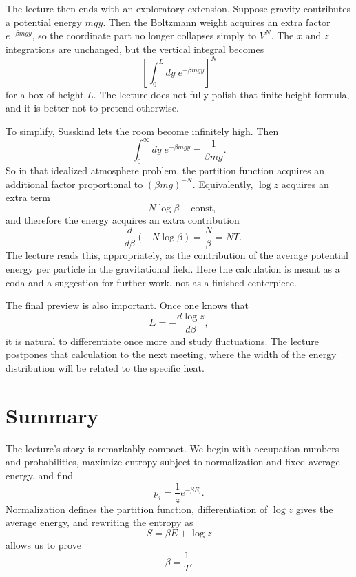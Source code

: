 The lecture then ends with an exploratory extension. Suppose gravity contributes a potential energy \(mgy\). Then the Boltzmann weight acquires an extra factor \(e^{-\beta mgy}\), so the coordinate part no longer collapses simply to \(V^N\). The \(x\) and \(z\) integrations are unchanged, but the vertical integral becomes
\begin{equation}
\left[\int_0^{L}dy\;e^{-\beta mgy}\right]^N
\end{equation}
for a box of height \(L\). The lecture does not fully polish that finite-height formula, and it is better not to pretend otherwise.

To simplify, Susskind lets the room become infinitely high. Then
\begin{equation}
\int_0^\infty dy\;e^{-\beta mgy}=\frac{1}{\beta m g}.
\end{equation}
So in that idealized atmosphere problem, the partition function acquires an additional factor proportional to \((\beta m g)^{-N}\). Equivalently, \(\log z\) acquires an extra term
\begin{equation}
-N\log\beta + \mathrm{const},
\end{equation}
and therefore the energy acquires an extra contribution
\begin{equation}
-\frac{d}{d\beta}\left(-N\log\beta\right)=\frac{N}{\beta}=NT.
\end{equation}
The lecture reads this, appropriately, as the contribution of the average potential energy per particle in the gravitational field. Here the calculation is meant as a coda and a suggestion for further work, not as a finished centerpiece.

The final preview is also important. Once one knows that
\begin{equation}
E=-\frac{d\log z}{d\beta},
\end{equation}
it is natural to differentiate once more and study fluctuations. The lecture postpones that calculation to the next meeting, where the width of the energy distribution will be related to the specific heat.

\section{Summary}

The lecture's story is remarkably compact. We begin with occupation numbers and probabilities, maximize entropy subject to normalization and fixed average energy, and find
\begin{equation}
p_i=\frac{1}{z}e^{-\beta E_i}.
\end{equation}
Normalization defines the partition function, differentiation of \(\log z\) gives the average energy, and rewriting the entropy as
\begin{equation}
S=\beta E+\log z
\end{equation}
allows us to prove
\begin{equation}
\beta=\frac{1}{T}.
\end{equation}

